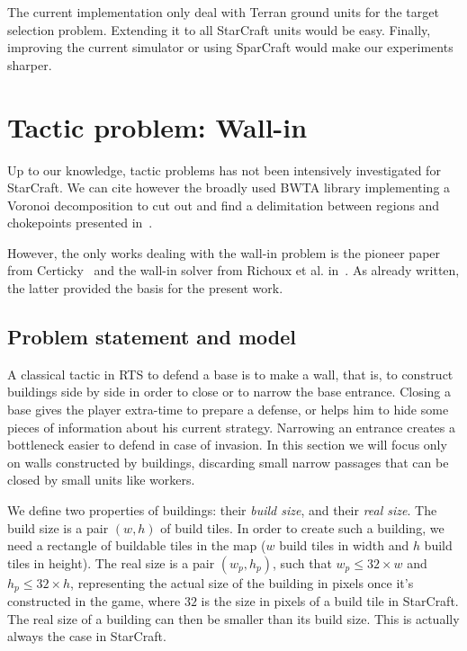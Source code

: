 \documentclass{article}
\begin{document}
The current implementation only deal  with Terran ground units for the
target selection problem.   Extending it to all  StarCraft units would
be easy. Finally,  improving the current simulator  or using SparCraft
would make our experiments sharper.

\section{Tactic problem: Wall-in}\label{sec:wall}

Up  to  our  knowledge,  tactic  problems  has  not  been  intensively
investigated for StarCraft.  We can cite however the broadly used BWTA
library implementing  a Voronoi  decomposition to cut  out and  find a
delimitation    between    regions     and    chokepoints    presented
in~\cite{Perkins10}.

However,  the only  works  dealing  with the  wall-in  problem is  the
pioneer paper  from Certicky~\cite{Certicky13} and the  wall-in solver
from Richoux  et al.   in~\cite{RichouxUO14}. As already  written, the
latter provided the basis for the present work.

\subsection{Problem statement and model}

A classical tactic in RTS to defend a base is to make a wall, that is,
to construct buildings side by side in order to close or to narrow the
base entrance. Closing a base gives the player extra-time to prepare a
defense, or  helps him to  hide some  pieces of information  about his
current strategy. Narrowing an entrance creates a bottleneck easier to
defend in  case of  invasion. In  this section we  will focus  only on
walls constructed by buildings,  discarding small narrow passages that
can be closed by small units like workers.

We define  two properties  of buildings: their  {\em build  size}, and
their {\em  real size}.  The  build size is a  pair $(w, h)$  of build
tiles. In  order to  create such  a building, we  need a  rectangle of
buildable tiles  in the map  ($w$ build tiles  in width and  $h$ build
tiles in height). The real size is a pair $(w_p, h_p)$, such that $w_p
\leq 32 \times w$ and $h_p  \leq 32 \times h$, representing the actual
size of  the building  in pixels  once it's  constructed in  the game,
where $32$  is the size  in pixels of a  build tile in  StarCraft. The
real size of a building can then  be smaller than its build size. This
is actually always the case in StarCraft.
\end{document}
